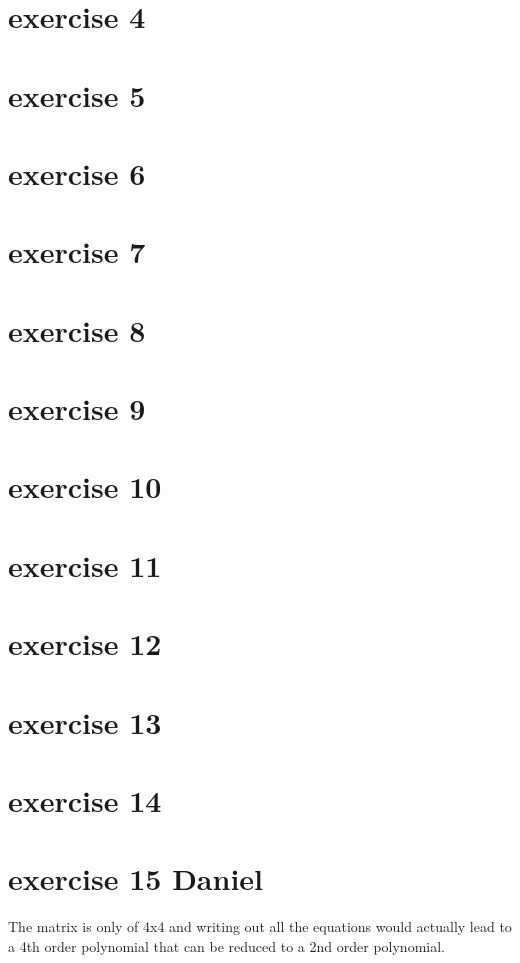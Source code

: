 \documentclass{article}
\begin{document}
\section{exercise 4}
\section{exercise 5}
\section{exercise 6}
\section{exercise 7}
\section{exercise 8}
\section{exercise 9}
\section{exercise 10}
\section{exercise 11}
\section{exercise 12}
\section{exercise 13}
\section{exercise 14}
\section{exercise 15 Daniel}
The matrix is only of 4x4 and writing out all the equations would actually lead to a 4th order polynomial that can be reduced to a 2nd order polynomial.
\end{document}

